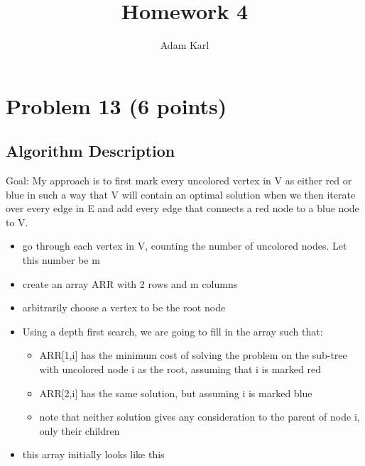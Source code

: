 \documentclass[a4paper]{article}
\title{Homework 4}
\author{Adam Karl}
\begin{document}
\maketitle

\section{Problem 13 (6 points)}
\subsection{Algorithm Description}

Goal: My approach is to first mark every uncolored vertex in V as either red or blue in such a way that V will contain an optimal solution when we then iterate over every edge in E and add every edge that connects a red node to a blue node to V. 

\begin{itemize}
    \item go through each vertex in V, counting the number of uncolored nodes. Let this number be m
    \item create an array ARR with 2 rows and m columns
    \item arbitrarily choose a vertex to be the root node
    \item Using a depth first search, we are going to fill in the array such that:
    \begin{itemize}
        \item ARR[1,i] has the minimum cost of solving the problem on the sub-tree with uncolored node i as the root, assuming that i is marked red
        \item ARR[2,i] has the same solution, but assuming i is marked blue
        \item note that neither solution gives any consideration to the parent of node i, only their children
    \end{itemize}
    \item this array initially looks like this
\end{itemize}
\end{document}
